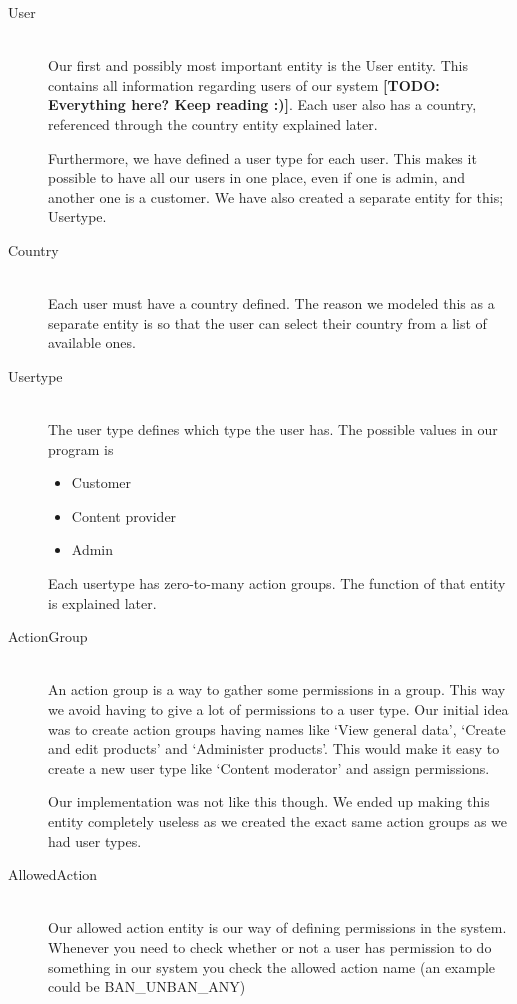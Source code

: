\begin{description}
\item[User] \hfill \\
Our first and possibly most important entity is the User entity. This contains all information regarding users of our system \textbf{[TODO: Everything here? Keep reading :)]}. Each user also has a country, referenced through the country entity explained later.

Furthermore, we have defined a user type for each user. This makes it possible to have all our users in one place, even if one is admin, and another one is a customer. We have also created a separate entity for this; Usertype.

\item[Country] \hfill \\
Each user must have a country defined. The reason we modeled this as a separate entity is so that the user can select their country from a list of available ones.

\item[Usertype] \hfill \\
The user type defines which type the user has. The possible values in our program is
\begin{itemize}
	\item Customer
	\item Content provider
	\item Admin
\end{itemize}

Each usertype has zero-to-many action groups. The function of that entity is explained later.

\item[ActionGroup] \hfill \\
An action group is a way to gather some permissions in a group. This way we avoid having to give a lot of permissions to a user type. Our initial idea was to create action groups having names like `View general data', `Create and edit products' and `Administer products'. This would make it easy to create a new user type like `Content moderator' and assign permissions.

Our implementation was not like this though. We ended up making this entity completely useless as we created the exact same action groups as we had user types.

\item[AllowedAction] \hfill \\
Our allowed action entity is our way of defining permissions in the system. Whenever you need to check whether or not a user has permission to do something in our system you check the allowed action name (an example could be BAN\_UNBAN\_ANY)


\end{description}
